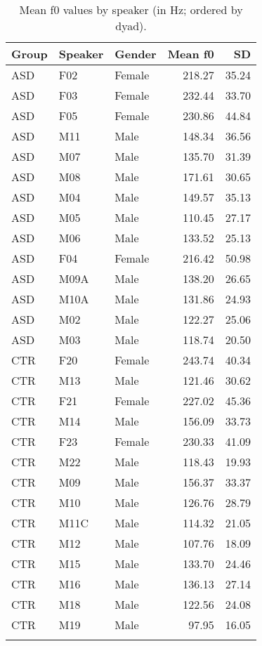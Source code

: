 \begin{table}
\caption{\label{tab:MeanfZeroSpeaker}Mean f0 values by speaker (in Hz; ordered by dyad).}
\begin{tabularx}{.8\textwidth}{XXXrr}
\lsptoprule
Group & Speaker & Gender & Mean f0 & SD\\
\midrule
ASD & F02 & Female & 218.27 & 35.24\\
ASD & F03 & Female & 232.44 & 33.70\\
ASD & F05 & Female & 230.86 & 44.84\\
ASD & M11 & Male & 148.34 & 36.56\\
ASD & M07 & Male & 135.70 & 31.39\\
ASD & M08 & Male & 171.61 & 30.65\\
ASD & M04 & Male & 149.57 & 35.13\\
ASD & M05 & Male & 110.45 & 27.17\\
ASD & M06 & Male & 133.52 & 25.13\\
ASD & F04 & Female & 216.42 & 50.98\\
ASD & M09A & Male & 138.20 & 26.65\\
ASD & M10A & Male & 131.86 & 24.93\\
ASD & M02 & Male & 122.27 & 25.06\\
ASD & M03 & Male & 118.74 & 20.50\\
CTR & F20 & Female & 243.74 & 40.34\\
CTR & M13 & Male & 121.46 & 30.62\\
CTR & F21 & Female & 227.02 & 45.36\\
CTR & M14 & Male & 156.09 & 33.73\\
CTR & F23 & Female & 230.33 & 41.09\\
CTR & M22 & Male & 118.43 & 19.93\\
CTR & M09 & Male & 156.37 & 33.37\\
CTR & M10 & Male & 126.76 & 28.79\\
CTR & M11C & Male & 114.32 & 21.05\\
CTR & M12 & Male & 107.76 & 18.09\\
CTR & M15 & Male & 133.70 & 24.46\\
CTR & M16 & Male & 136.13 & 27.14\\
CTR & M18 & Male & 122.56 & 24.08\\
CTR & M19 & Male & 97.95 & 16.05\\
\lspbottomrule
\end{tabularx}
\end{table}
\clearpage

